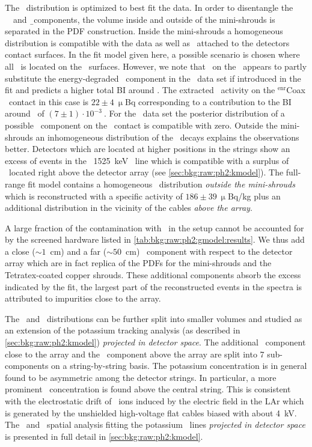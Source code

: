 The \kvz\ distribution is optimized to best fit the data. In order to disentangle the
\kvz\ \g\  and \b\ components, the volume inside and outside of the mini-shrouds is
separated in the PDF construction. Inside the mini-shrouds a homogeneous distribution is
compatible with the data as well as \kvz\ attached to the detectors contact surfaces. In
the fit model given here, a possible scenario is chosen where all \kvz\ is located on the
\nplus\ surfaces. However, we note that \kvz\ on the \pplus\ appears to partly substitute
the energy-degraded \a\ component in the \enrCoaxII\ data set if introduced in the fit and
predicts a higher total BI around \qbb. The extracted \kvz\ activity on the
$^{\text{enr}}$Coax \pplus\ contact in this case is $22\pm4~\upmu$Bq corresponding to a
contribution to the BI around \qbb\ of $(7\pm1)\cdot10^{-3}~$\ctsper. For the \enrBEGeII\
data set the posterior distribution of a possible \kvz\ component on the \pplus\ contact
is compatible with zero. Outside the mini-shrouds an inhomogeneous distribution of the
\kvz\ decays explains the observations better. Detectors which are located at higher
positions in the strings show an excess of events in the \kvz\ 1525~keV \g\ line which is
compatible with a surplus of \kvz\ located right above the detector array (see
\cref{sec:bkg:raw:ph2:kmodel}). The full-range fit model contains a homogeneous \kvz\
distribution \textit{outside the mini-shrouds} which is reconstructed with a specific
activity of $186\pm39~\upmu$Bq/kg plus an additional distribution in the vicinity of the
cables \textit{above the array}.

A large fraction of the contamination with \kvn\ in the setup cannot be accounted for by
the screened hardware listed in \cref{tab:bkg:raw:ph2:gmodel:results}. We thus add a close
($\sim1$~cm) and a far ($\sim50$~cm) \kvn\ component with respect to the detector array
which are in fact replica of the PDFs for the mini-shrouds and the Tetratex\reg-coated copper
shrouds. These additional components absorb the excess indicated by the fit, the largest
part of the reconstructed events in the spectra is attributed to impurities close to the
array.

The \kvn\ and \kvz\ distributions can be further split into smaller volumes and studied as
an extension of the potassium tracking analysis (as described in
\cref{sec:bkg:raw:ph2:kmodel}) \textit{projected in detector space}. The additional \kvn\
component close to the array and the \kvz\ component above the array are split into 7
sub-components on a string-by-string basis. The potassium concentration is in general
found to be asymmetric among the detector strings. In particular, a more prominent \kvz\
concentration is found above the central string. This is consistent with the electrostatic
drift of \kvz\ ions induced by the electric field in the LAr which is generated by the
unshielded high-voltage flat cables biased with about 4~kV. The \kvn\ and \kvz\ spatial
analysis fitting the potassium \g\ lines \textit{projected in detector space} is presented
in full detail in \cref{sec:bkg:raw:ph2:kmodel}.

